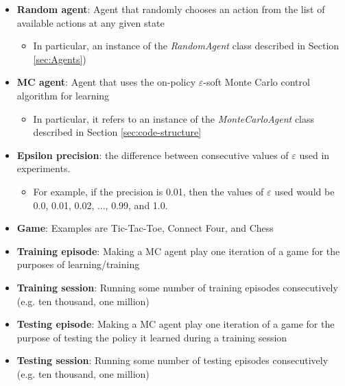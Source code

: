 \documentclass[11pt,a4paper]{report}
\begin{document}
\begin{itemize}

	\item \textbf{Random agent}: Agent that randomly chooses an action from the list of available actions at any given state
		\begin{itemize}
			\item In particular, an instance of the \emph{RandomAgent} class described in Section \ref{sec:Agents})
		\end{itemize}

	\item \textbf{MC agent}: Agent that uses the on-policy $\varepsilon$-soft Monte Carlo control algorithm for learning
		\begin{itemize}
			\item In particular, it refers to an instance of the \emph{MonteCarloAgent} class described in Section \ref{sec:code-structure}
		\end{itemize}

	\item \textbf{Epsilon precision}: the difference between consecutive values of $\varepsilon$ used in experiments.
		\begin{itemize}
			\item For example, if the precision is 0.01, then the values of $\varepsilon$ used would be 0.0, 0.01, 0.02, ..., 0.99, and 1.0.
		\end{itemize}

	\item \textbf{Game}: Examples are Tic-Tac-Toe, Connect Four, and Chess

	\item \textbf{Training episode}: Making a MC agent play one iteration of a game for the purposes of learning/training

	\item \textbf{Training session}: Running some number of training episodes consecutively (e.g. ten thousand, one million)

	\item \textbf{Testing episode}: Making a MC agent play one iteration of a game for the purpose of testing the policy it learned during a training session

	\item \textbf{Testing session}: Running some number of testing episodes consecutively (e.g. ten thousand, one million)

\end{itemize}
\end{document}
